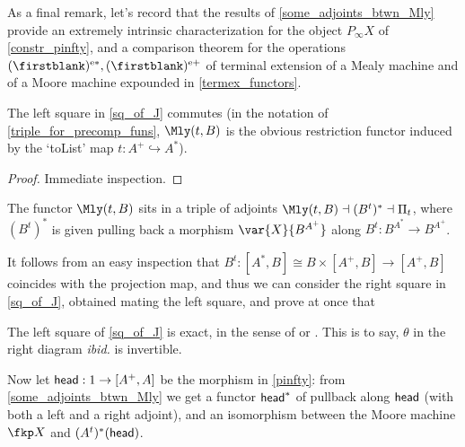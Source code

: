 As a final remark, let's record that the results of \autoref{some_adjoints_btwn_Mly} provide an extremely intrinsic characterization for the object $P_\infty X$ of \autoref{constr_pinfty}, and a comparison theorem for the operations $(\firstblank)^\mreExt,(\firstblank)^\mlyExt$ of terminal extension of a Mealy machine and of a Moore machine expounded in \autoref{termex_functors}.
\begin{lemma}
  The left square in \eqref{sq_of_J}
  commutes (in the notation of \eqref{triple_for_precomp_funs}, $\Mly(t,B)$ is the obvious restriction functor induced by the `toList' map $t : A^+\hookrightarrow A^*$).
\end{lemma}
\begin{proof}
  Immediate inspection.
\end{proof}
\begin{corollary}
  The functor $\Mly(t,B)$ sits in a triple of adjoints $\Mly(t,B) \dashv (B^t)^* \dashv \Pi_t$, where $(B^t)^*$ is given pulling back a morphism $\var{X}{B^{A^+}}$ along $B^t : B^{A^*}\to B^{A^+}$.
\end{corollary}
It follows from an easy inspection that $B^t : [A^*,B]\cong B\times [A^+,B]\to [A^+,B]$ coincides with the projection map, and thus we can consider the right square in \eqref{sq_of_J},
obtained mating the left square, and prove at once that
\begin{proposition}
  The left square of \eqref{sq_of_J} is exact, in the sense of \cite{guitart:1980,Guitart1981,Pavlovi1991} or \cite[1.8.9.(b)]{CLTT}. This is to say, $\theta$ in the right diagram \emph{ibid.} is invertible.
\end{proposition}
Now let $\textsf{head} : 1\to [A^+,A]$ be the morphism in \eqref{pinfty}: from \autoref{some_adjoints_btwn_Mly} we get a functor $\textsf{head}^*$ of pullback along $\textsf{head}$ (with both a left and a right adjoint), and an isomorphism between the Moore machine $\fkp X$ and $(A^t)^*(\textsf{head})$.